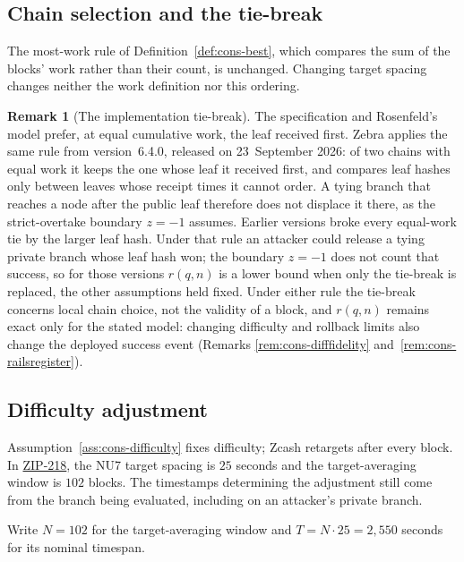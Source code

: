 \documentclass[11pt,a4paper]{article}
\theoremstyle{definition}
\newtheorem{remark}[theorem]{Remark}
\begin{document}
\subsection{Chain selection and the tie-break}\label{sec:cons-selection}

The most-work rule of Definition~\ref{def:cons-best}, which compares the
sum of the blocks' work rather than their count, is unchanged. Changing target
spacing changes neither the work definition nor this ordering.

\begin{remark}[The implementation tie-break]\label{rem:cons-tiebreak}
The specification and Rosenfeld's model prefer, at equal cumulative work,
the leaf received first. Zebra applies the same rule from version~6.4.0,
released on 23~September 2026: of two chains with equal work it keeps the
one whose leaf it received first, and compares leaf hashes only between
leaves whose receipt times it cannot order. A tying branch that reaches a
node after the public leaf therefore does not displace it there, as the
strict-overtake boundary $z=-1$ assumes. Earlier versions broke every
equal-work tie by the larger leaf hash. Under that rule an attacker could
release a tying private branch whose leaf hash won; the boundary $z=-1$ does
not count that success, so for those versions $r(q,n)$ is a lower bound
when only the tie-break is replaced, the other assumptions held fixed. Under
either rule the tie-break concerns local chain choice, not the validity of a
block, and $r(q,n)$ remains exact only for the stated model: changing
difficulty and rollback limits also change the deployed success event
(Remarks \ref{rem:cons-difffidelity} and~\ref{rem:cons-railsregister}).
\end{remark}

\subsection{Difficulty adjustment}\label{sec:cons-difficulty}
\label{sec:cons-nu7-time}

Assumption~\ref{ass:cons-difficulty} fixes difficulty; Zcash retargets
after every block. In \href{https://zips.z.cash/zip-0218}{ZIP-218}, the NU7
target spacing is $25$ seconds and the target-averaging window is $102$
blocks. The timestamps determining the adjustment still come from the
branch being evaluated, including on an attacker's private branch.

Write $N=102$ for the target-averaging window and $T=N\cdot25=2{,}550$
seconds for its nominal timespan.
\end{document}
